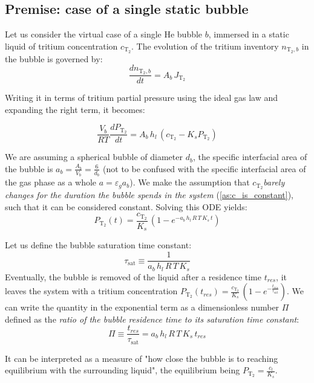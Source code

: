 \documentclass[a4paper,11pt,oneside]{report}
\newcommand{\PT}{\ensuremath{P_\mathrm{T_2}}}
\newcommand{\CT}{\ensuremath{c_\mathrm{T_2}}}
\newcommand{\JT}{\ensuremath{J_\mathrm{T_2}}}
\newcounter{assumption}[chapter]
\newcommand{\assumption}[1]{\refstepcounter{assumption}\textit{#1}}
\begin{document}
\subsection{Premise: case of a single static bubble}
Let us consider the virtual case of a single He bubble $b$, immersed in a static liquid of tritium concentration \CT. The evolution of the tritium inventory $n_{\mathrm{T_2},b}$ in the bubble is governed by:
\begin{equation}
\label{eq:nb}
    \frac{dn_{\mathrm{T_2},b}}{dt} = A_b\,\JT
\end{equation}

Writing it in terms of tritium partial pressure using the ideal gas law and expanding the right term, it becomes:

\begin{equation}
\label{eq:Pb_ODE}
    \frac{V_b}{RT}\frac{d\PT}{dt} = A_b\,h_l\,(\CT-K_s\PT)
\end{equation}

We are assuming a spherical bubble of diameter $d_b$, the specific interfacial area of the bubble is $a_b=\frac{A_b}{V_b}=\frac{6}{d_b}$ (not to be confused with the specific interfacial area of the gas phase as a whole $a=\varepsilon_ga_b$). We make the assumption that \assumption{\CT barely changes for the duration the bubble spends in the system \label{as:c_is_constant}} (\cref{as:c_is_constant}), such that it can be considered constant. 
Solving this ODE yields:
\begin{equation}
    \PT(t)=\frac{\CT}{K_s}\,(1-e^{-a_b\,h_l\,R\,T\,K_s\,t})
\end{equation}

Let us define the bubble saturation time constant:
\begin{equation}
    \tau_\mathrm{sat}\equiv \frac{1}{a_b\,h_l\,R\,T\,K_s}
\end{equation}
Eventually, the bubble is removed of the liquid after a residence time $t_{res}$, it leaves the system with a tritium concentration $\PT(t_{res})=\frac{\CT}{K_s}\,(1-e^{-\frac{t_{res}}{\tau_\mathrm{sat}}})$. We can write the quantity in the exponential term as a dimensionless number $\Pi$ defined as the \textit{ratio of the bubble residence time to its saturation time constant}:
\begin{equation}
    \label{eq:Pi_def_micro}
    \boxed{\Pi\equiv \frac{t_{res}}{\tau_\mathrm{sat}}= a_b\,h_l\,R\,T\,K_s\,t_{res}}
\end{equation}

It can be interpreted as a measure of "how close the bubble is to reaching equilibrium with the surrounding liquid", the equilibrium being $\PT=\frac{c_l}{K_s}$. 
\end{document}
